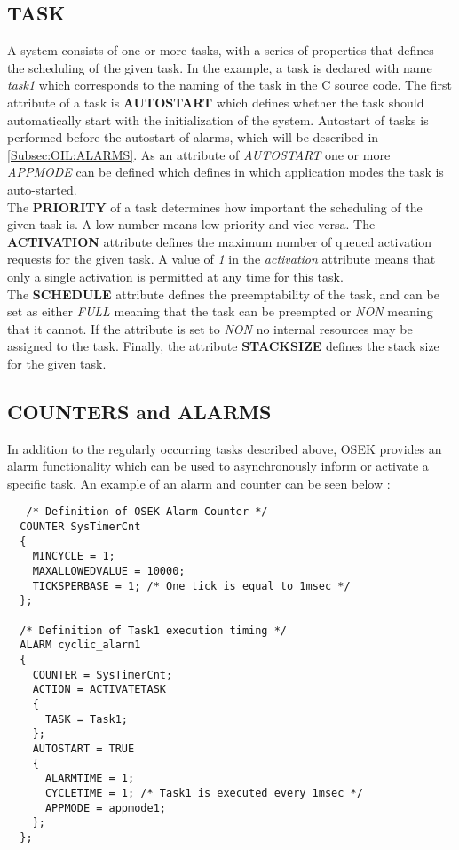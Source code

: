 \subsection{TASK}
A system consists of one or more tasks, with a series of properties that defines the scheduling of the given task.
In the example, a task is declared with name \textit{task1} which corresponds to the naming of the task in the C source code.
The first attribute of a task is \textbf{AUTOSTART} which defines whether the task should automatically start with the initialization of the system.
Autostart of tasks is performed before the autostart of alarms, which will be described in \autoref{Subsec:OIL:ALARMS}\cite{irisa223}.
As an attribute of \textit{AUTOSTART} one or more \textit{APPMODE} can be defined which defines in which application modes the task is auto-started.\\
The \textbf{PRIORITY} of a task determines how important the scheduling of the given task is.
A low number means low priority and vice versa. 
The \textbf{ACTIVATION} attribute defines the maximum number of queued activation requests for the given task.
A value of \textit{1} in the \textit{activation} attribute means that only a single activation is permitted at any time for this task.\\
The \textbf{SCHEDULE} attribute defines the preemptability of the task, and can be set as either \textit{FULL} meaning that the task can be preempted or \textit{NON} meaning that it cannot.
If the attribute is set to \textit{NON} no internal resources may be assigned to the task\cite{irisa25}.
Finally, the attribute \textbf{STACKSIZE} defines the stack size for the given task.

\subsection{COUNTERS and ALARMS}\label{Subsec:OIL:ALARMS}
In addition to the regularly occurring tasks described above, OSEK provides an alarm functionality which can be used to asynchronously inform or activate a specific task.
An example of an alarm and counter can be seen below \cite{rms}:
\begin{lstlisting}
   /* Definition of OSEK Alarm Counter */
  COUNTER SysTimerCnt
  {
    MINCYCLE = 1;
    MAXALLOWEDVALUE = 10000;
    TICKSPERBASE = 1; /* One tick is equal to 1msec */
  };

  /* Definition of Task1 execution timing */
  ALARM cyclic_alarm1
  {
    COUNTER = SysTimerCnt;
    ACTION = ACTIVATETASK
    {
      TASK = Task1;
    };
    AUTOSTART = TRUE
    {
      ALARMTIME = 1;
      CYCLETIME = 1; /* Task1 is executed every 1msec */
      APPMODE = appmode1;
    };
  };
\end{lstlisting}


